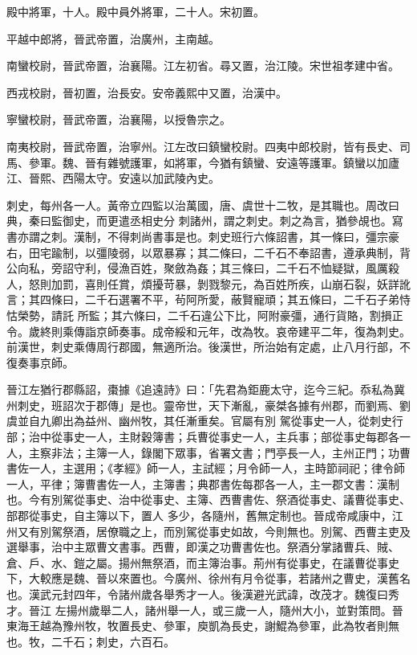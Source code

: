 \begin{pinyinscope}
 殿中將軍，十人。殿中員外將軍，二十人。宋初置。



 平越中郎將，晉武帝置，治廣州，主南越。



 南蠻校尉，晉武帝置，治襄陽。江左初省。尋又置，治江陵。宋世祖孝建中省。



 西戎校尉，晉初置，治長安。安帝義熙中又置，治漢中。



 寧蠻校尉，晉武帝置，治襄陽，以授魯宗之。



 南夷校尉，晉武帝置，治寧州。江左改曰鎮蠻校尉。四夷中郎校尉，皆有長史、司馬、參軍。魏、晉有雜號護軍，如將軍，今猶有鎮蠻、安遠等護軍。鎮蠻以加廬江、晉熙、西陽太守。安遠以加武陵內史。



 刺史，每州各一人。黃帝立四監以治萬國，唐、虞世十二牧，是其職也。周改曰典，秦曰監御史，而更遣丞相史分
 刺諸州，謂之刺史。刺之為言，猶參覘也。寫書亦謂之刺。漢制，不得刺尚書事是也。刺史班行六條詔書，其一條曰，彊宗豪右，田宅踰制，以彊陵弱，以眾暴寡；其二條曰，二千石不奉詔書，遵承典制，背公向私，旁詔守利，侵漁百姓，聚斂為姦；其三條曰，二千石不恤疑獄，風厲殺人，怒則加罰，喜則任賞，煩擾苛暴，剝戮黎元，為百姓所疾，山崩石裂，妖詳訛言；其四條曰，二千石選署不平，茍阿所愛，蔽賢寵頑；其五條曰，二千石子弟恃怙榮勢，請託
 所監；其六條曰，二千石違公下比，阿附豪彊，通行貨賂，割損正令。歲終則乘傳詣京師奏事。成帝綏和元年，改為牧。哀帝建平二年，復為刺史。前漢世，刺史乘傳周行郡國，無適所治。後漢世，所治始有定處，止八月行部，不復奏事京師。



 晉江左猶行郡縣詔，棗據《追遠詩》曰：「先君為鉅鹿太守，迄今三紀。忝私為冀州刺史，班詔次于郡傳」是也。靈帝世，天下漸亂，豪桀各據有州郡，而劉焉、劉虞並自九卿出為益州、幽州牧，其任漸重矣。官屬有別
 駕從事史一人，從刺史行部；治中從事史一人，主財穀簿書；兵曹從事史一人，主兵事；部從事史每郡各一人，主察非法；主簿一人，錄閣下眾事，省署文書；門亭長一人，主州正門；功曹書佐一人，主選用；《孝經》師一人，主試經；月令師一人，主時節祠祀；律令師一人，平律；簿曹書佐一人，主簿書；典郡書佐每郡各一人，主一郡文書：漢制也。今有別駕從事史、治中從事史、主簿、西曹書佐、祭酒從事史、議曹從事史、部郡從事史，自主簿以下，置人
 多少，各隨州，舊無定制也。晉成帝咸康中，江州又有別駕祭酒，居僚職之上，而別駕從事史如故，今則無也。別駕、西曹主吏及選舉事，治中主眾曹文書事。西曹，即漢之功曹書佐也。祭酒分掌諸曹兵、賊、倉、戶、水、鎧之屬。揚州無祭酒，而主簿治事。荊州有從事史，在議曹從事史下，大較應是魏、晉以來置也。今廣州、徐州有月令從事，若諸州之曹史，漢舊名也。漢武元封四年，令諸州歲各舉秀才一人。後漢避光武諱，改茂才。魏復曰秀才。晉江
 左揚州歲舉二人，諸州舉一人，或三歲一人，隨州大小，並對策問。晉東海王越為豫州牧，牧置長史、參軍，庾凱為長史，謝鯤為參軍，此為牧者則無也。牧，二千石；刺史，六百石。




\end{pinyinscope}
